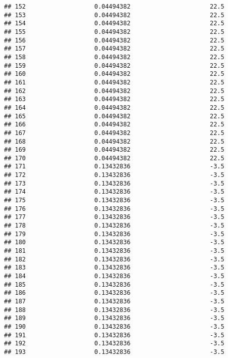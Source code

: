 \documentclass[]{article}
\begin{document}
\begin{verbatim}
## 152                   0.04494382                      22.5
## 153                   0.04494382                      22.5
## 154                   0.04494382                      22.5
## 155                   0.04494382                      22.5
## 156                   0.04494382                      22.5
## 157                   0.04494382                      22.5
## 158                   0.04494382                      22.5
## 159                   0.04494382                      22.5
## 160                   0.04494382                      22.5
## 161                   0.04494382                      22.5
## 162                   0.04494382                      22.5
## 163                   0.04494382                      22.5
## 164                   0.04494382                      22.5
## 165                   0.04494382                      22.5
## 166                   0.04494382                      22.5
## 167                   0.04494382                      22.5
## 168                   0.04494382                      22.5
## 169                   0.04494382                      22.5
## 170                   0.04494382                      22.5
## 171                   0.13432836                      -3.5
## 172                   0.13432836                      -3.5
## 173                   0.13432836                      -3.5
## 174                   0.13432836                      -3.5
## 175                   0.13432836                      -3.5
## 176                   0.13432836                      -3.5
## 177                   0.13432836                      -3.5
## 178                   0.13432836                      -3.5
## 179                   0.13432836                      -3.5
## 180                   0.13432836                      -3.5
## 181                   0.13432836                      -3.5
## 182                   0.13432836                      -3.5
## 183                   0.13432836                      -3.5
## 184                   0.13432836                      -3.5
## 185                   0.13432836                      -3.5
## 186                   0.13432836                      -3.5
## 187                   0.13432836                      -3.5
## 188                   0.13432836                      -3.5
## 189                   0.13432836                      -3.5
## 190                   0.13432836                      -3.5
## 191                   0.13432836                      -3.5
## 192                   0.13432836                      -3.5
## 193                   0.13432836                      -3.5

\end{verbatim}
\end{document}
